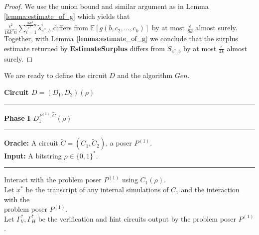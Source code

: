 \begin{proof}
We use the union bound and similar argument as in Lemma \ref{lemma:estimate_of_g}
which yields that \\$\frac{\epsilon^2}{16k^2n} \sum_{i=1}^{\frac{16k^2}{\epsilon^2}n} \widetilde{s}_{\pi^*,b}^i$ differs from
$\mathbb{E}[g(b, c_2, \dots, c_k)]$ by at most $\frac{\epsilon}{8k}$ almost surely. Together, with Lemma $\ref{lemma:estimate_of_g}$ we conclude that the surplus estimate
returned by \textbf{EstimateSurplus} differs from $S_{\pi^*,b}$ by at most $\frac{\epsilon}{4k}$ almost surely.
\end{proof}
We are ready to define the circuit $D$ and the algorithm $Gen$.
%
\begin{codeblock}
  \textbf{Circuit $D = (D_1, D_2) (\rho)$}
  \medskip \hrule \medskip
  \textbf{Phase I $D_1^{P^{(1)}, \widetilde{C}}(\rho)$}
  \medskip \hrule \medskip
  \textbf{Oracle:} A circuit $\widetilde{C} = (C_1, \widetilde{C}_2)$, a poser $P^{(1)}$.\\
  \textbf{Input:} A bitstring $\rho \in \{0,1\}^{*}$.
  \medskip\hrule\medskip

  Interact with the problem poser $P^{(1)}$ using $C_1(\rho)$. \\
  \IndI Let $x^*$ be the transcript of any internal simulations of $C_1$ and the interaction with the  \\ \IndI problem poser $P^{(1)}$.\\
  \IndI Let $\Gamma_V^*, \Gamma_H^*$ be the verification and hint circuits output by the problem poser $P^{(1)}$.


\end{codeblock}
